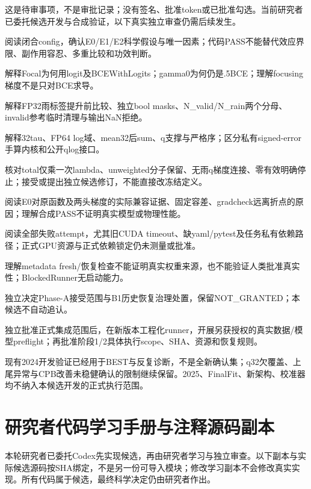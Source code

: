 \documentclass[UTF8,fontset=fandol,10pt]{ctexart}
\begin{document}
这是待审事项，不是审批记录；没有签名、批准token或已批准勾选。当前研究者已委托候选开发与合成验证，以下真实独立审查仍需后续发生。

\noindent\textbullet\quad 阅读闭合config，确认E0/\allowbreak{}E1/\allowbreak{}E2科学假设与唯一因素；代码PASS不能替代效应界限、副作用容忍、多重比较和功效判断。\par
\noindent\textbullet\quad 解释Focal为何用logit及BCEWithLogits；gamma0为何仍是.5BCE；理解focusing梯度不是只对BCE求导。\par
\noindent\textbullet\quad 解释FP32雨标签提升前比较、独立bool masks、N\_\allowbreak{}valid/\allowbreak{}N\_\allowbreak{}rain两个分母、invalid参考临时清理与输出NaN拒绝。\par
\noindent\textbullet\quad 解释32tau、FP64 log域、mean32后sum、q支撑与严格序；区分私有signed-error手算内核和公开qlog接口。\par
\noindent\textbullet\quad 核对total仅乘一次lambda、unweighted分子保留、无雨q梯度连接、零有效明确停止；接受或提出独立候选修订，不能直接改冻结定义。\par
\noindent\textbullet\quad 阅读E0对原函数及两头梯度的实际兼容证据、固定容差、gradcheck远离折点的原因；理解合成PASS不证明真实模型或物理性能。\par
\noindent\textbullet\quad 阅读全部失败attempt，尤其旧CUDA timeout、缺yaml/\allowbreak{}pytest及任务私有依赖路径；正式GPU资源与正式依赖锁定仍未测量或批准。\par
\noindent\textbullet\quad 理解metadata fresh/\allowbreak{}恢复检查不能证明真实权重来源，也不能验证人类批准真实性；BlockedRunner无启动能力。\par
\noindent\textbullet\quad 独立决定Phase-A接受范围与B1历史恢复治理处置，保留NOT\_\allowbreak{}GRANTED；本候选不自动追认。\par
\noindent\textbullet\quad 独立批准正式集成范围后，在新版本工程化runner，开展另获授权的真实数据/\allowbreak{}模型preflight；再批准阶段1/\allowbreak{}2具体执行scope、SHA、资源和恢复规则。\par

现有2024开发验证已经用于BEST与反复诊断，不是全新确认集；q32欠覆盖、上尾异常与CPB改善未稳健确认的限制继续保留。2025、FinalFit、新架构、校准器均不纳入本候选开发的正式执行范围。
\clearpage\section{研究者代码学习手册与注释源码副本}

本轮研究者已委托Codex先实现候选，再由研究者学习与独立审查。以下副本与实际候选源码按SHA绑定，不是另一份可导入模块；修改学习副本不会修改真实实现。所有代码属于候选，最终科学决定仍由研究者作出。
\end{document}

